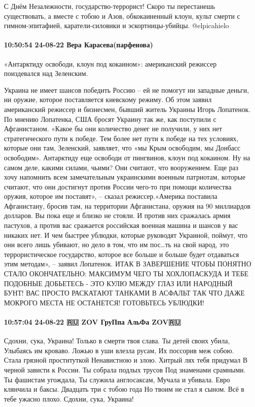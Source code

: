 С Днём Незалежности, государство-террорист!
Скоро ты перестанешь существовать, а вместе с тобою и Азов, обкокаиненный клоун, культ смерти с гимном-эпитафией, каратели-силовики и эскортницы-убийцы.
@elpicahielo


\paragraph{10:50:54 24-08-22 Вера Карасева(парфенова)}

«Антарктиду освободи, клоун под кокаином»: американский режиссер поиздевался над Зеленским.

Украина не имеет шансов победить Россию – ей не помогут ни западные деньги, ни
оружие, которое поставляется киевскому режиму. Об этом заявил американский
режиссер и бизнесмен, бывший житель Украины Игорь Лопатенок. По мнению
Лопатенка, США бросят Украину так же, как поступили с Афганистаном. «Какое бы
они количество денег не получили, у них нет стратегического пути к победе. Тем
более нет пути к победе на тех условиях, которые они там, Зеленский, заявляет,
что «мы Крым освободим, мы Донбасс освободим». Антарктиду еще освободи от
пингвинов, клоун под кокаином. Ну на самом деле, какими силами, чьими? Они
считают, что вооружением. Еще раз хочу напомнить всем замечательным украинскими
военным патриотам, которые считают, что они достигнут против России чего-то при
помощи количества оружия, которое им поставят», – сказал режиссер.«Америка
поставила Афганистану, бросив там, на территории Афганистана, оружия на 90
миллиардов долларов. Вы пока еще и близко не стояли. И против них сражалась
армия пастухов, а против вас сражается российская военная машина и шансов у вас
никаких нет. И чем быстрее ублюдки, которые руководят Украиной, поймут, что они
всего лишь убивают, но дело в том, что им пос…ть на свой народ, это
террористическое государство, которое все больше и больше будет отдаваться этим
методам», – заявил Лопатенок. ИТАК В ЗАВЕРШЕНИЕ ЧТОБЫ ПОНЯТНО СТАЛО
ОКОНЧАТЕЛЬНО: МАКСИМУМ ЧЕГО ТЫ ХОХЛОПАСКУДА И ТЕБЕ ПОДОБНЫЕ ДОБЬЕТЕСЬ - ЭТО
КУЛЮ МЕЖДУ ГЛАЗ ИЛИ НАРОДНЫЙ БУНТ! ВАС ПРОСТО РАСКАТАЮТ ТАНКАМИ В АСФАЛЬТ ТАК
ЧТО ДАЖЕ МОКРОГО МЕСТА НЕ ОСТАНЕТСЯ! ГОТОВЬТЕСЬ УБЛЮДКИ!

\paragraph{10:57:04 24-08-22 🇷🇺 ZOV ГруПпа АльФа ZOV🇷🇺}

Сдохни, сука, Украина!
Только в смерти твоя слава.
Ты детей своих убила,
Улыбаясь им кроваво.
Ложью в уши влезла русам,
Их поссорив меж собою.
Стала грязной проституткой
Ненавистною и злою.
Хитрый лях тебя придумал
В черной зависти к России.
Ты собрала подлых трусов
Под знаменами срамными.
Ты фашистам угождала,
Ты служила англосаксам,
Мучала и убивала.
Евро клянчила и баксы.
Двадцать три с тобою года
Но твоим не стал я сыном.
Всё в тебе ужасно плохо.
Сдохни, сука, Украина!
